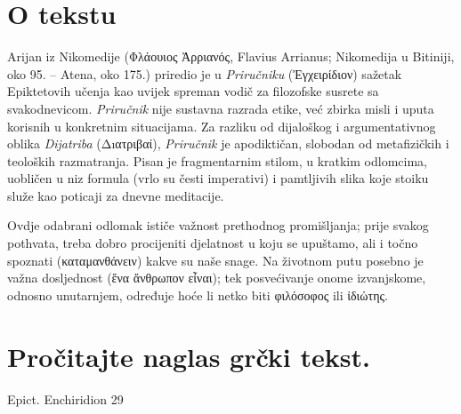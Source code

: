 


\section*{O tekstu}

Arijan iz Nikomedije \textgreek[variant=ancient]{(Φλάουιος Ἀρριανός,} Flavius Arrianus; Nikomedija u Bitiniji, oko 95. – Atena, oko 175.) priredio je u \textit{Priručniku} \textgreek[variant=ancient]{(Ἐγχειρίδιον)} sažetak Epiktetovih učenja kao uvijek spreman vodič za filozofske susrete sa svakodnevicom. \textit{Priručnik} nije sustavna razrada etike, već zbirka misli i uputa korisnih u konkretnim situacijama. Za razliku od dijaloškog i argumentativnog oblika \textit{Dijatriba} \textgreek[variant=ancient]{(Δıατριβαί),} \textit{Priručnik} je apodiktičan, slobodan od metafizičkih i teoloških razmatranja. Pisan je fragmentarnim stilom, u kratkim odlomcima, uobličen u niz formula (vrlo su česti imperativi) i pamtljivih slika koje stoiku služe kao poticaji za dnevne meditacije.

Ovdje odabrani odlomak ističe važnost prethodnog promišljanja; prije svakog pothvata, treba dobro procijeniti djelatnost u koju se upuštamo, ali i točno spoznati \textgreek[variant=ancient]{(καταμανθάνειν)} kakve su naše snage. Na životnom putu posebno je važna dosljednost \textgreek[variant=ancient]{(ἕνα ἄνθρωπον εἶναι);} tek posvećivanje onome izvanjskome, odnosno unutarnjem, određuje hoće li netko biti \textgreek[variant=ancient]{φιλόσοφος ili ἰδιώτης.}

\newpage

\section*{Pročitajte naglas grčki tekst.}

Epict. Enchiridion 29


\medskip


